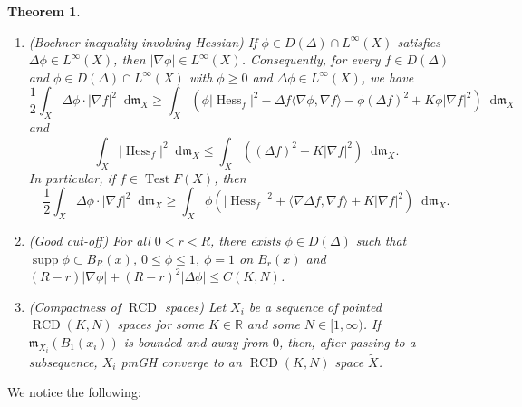 \documentclass[11pt,reqno]{amsart}
\newtheorem{theorem}{Theorem}[section]
\theoremstyle{definition}
\numberwithin{equation}{section}
\newcommand{\di}{\mathop{}\!\mathrm{d}}
\newcommand{\meas}{\mathfrak{m}}
\DeclareMathOperator{\Hess}{Hess}
\DeclareMathOperator{\Lip}{Lip}
\DeclareMathOperator{\RCD}{RCD}
\DeclareMathOperator{\Test}{Test}
\DeclareMathOperator{\supp}{supp}
\begin{document}
\begin{theorem}
\begin{enumerate}
for $\meas_X$-a.e., for all $h_i \in \Test F(X)(i=1,2)$, where
$$
    \Test F(X):= \{f \in D(\Delta) \cap L^{\infty} \cap \Lip (X) \,|\, \Delta f \in W^{1,2}(X)\}.
$$
\item{(Bochner inequality involving Hessian)} If $\phi \in D(\Delta) \cap L^{\infty}(X)$ satisfies $\Delta \phi \in L^{\infty}(X)$, then $|\nabla \phi| \in L^{\infty}(X)$. Consequently, for every $f \in D(\Delta)$ and $\phi \in D(\Delta)\cap L^{\infty}(X)$ with $\phi \ge 0$ and $\Delta \phi \in L^{\infty}(X)$, we have
\begin{equation}\label{bohhhhh}
    \frac{1}{2}\int_X\Delta \phi \cdot |\nabla f|^2\di \meas_X\ge \int_X\left(\phi|\Hess_f|^2- \Delta f\langle \nabla \phi, \nabla f\rangle -\phi(\Delta f)^2+K\phi|\nabla f|^2\right)\di \meas_X
\end{equation}
and 
\begin{equation}\label{czrcd}
    \int_X|\Hess_f|^2\di \meas_X \le \int_X\left( (\Delta f)^2-K|\nabla f|^2\right)\di \meas_X.
\end{equation}
In particular, if $f \in \Test F(X)$, then 
\begin{equation}\label{boshnnnss}
    \frac{1}{2}\int_X\Delta \phi \cdot |\nabla f|^2\di \meas_X\ge \int_X\phi\left(|\Hess_f|^2+\langle \nabla \Delta f, \nabla f\rangle +K|\nabla f|^2\right)\di \meas_X.
\end{equation}
\item{(Good cut-off)} For all $0<r<R$, there exists $\phi \in D(\Delta)$ such that $\supp \phi \subset B_R(x)$, $0 \le \phi \le 1$, $\phi=1$ on $B_r(x)$ and  
$(R - r) |\nabla \phi| + (R - r)^2 |\Delta \phi| \le C(K, N)$.
        \item{(Compactness of $\RCD$ spaces)} Let $X_i$ be a sequence of pointed $\RCD(K,N)$ spaces for some $K \in \mathbb{R}$ and some $N \in [1, \infty)$. If $\meas_{X_i}(B_1(x_i))$ is bounded and away from $0$,
    then, after passing to a subsequence, $X_i$ pmGH converge to an $\RCD(K, N)$ space $\tilde X$.
    \end{enumerate}
\end{theorem}
We notice the following: 
\end{document}

